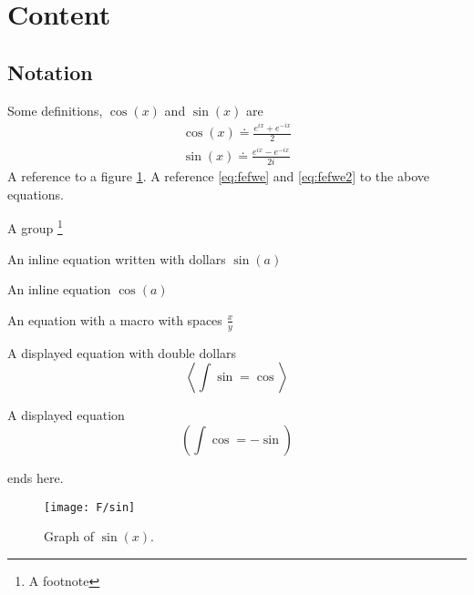 \section{Content}

\subsection{Notation}

\begin{Defn}
  \label{defn:1}
  Some definitions, $\cos(x)$ and \(\sin(x)\) are
  \begin{eqnarray}
    \cos(x) \doteq \frac{e^{ix}+e^{-ix}}{2}  \label{eq:fefwe} \\
    \sin(x) \doteq \frac{e^{ix}-e^{-ix}}{2i} \label{eq:fefwe2}
  \end{eqnarray}
  A reference to a figure \ref{fig:a354}.
  A reference \eqref{eq:fefwe} and  \eqref{eq:fefwe2} to the above equations.
\end{Defn}


A group
\footnote{A footnote}
\bgroup\em

An inline equation written with dollars $\sin(a)$

An inline equation  \(\cos(a)\)

An equation with a macro with spaces
\(\frac x y\)

A displayed equation with double dollars
$$ \left<\int\sin = \cos \right>$$

A displayed equation
\[ \left(\int\cos = -\sin\right)\]

\egroup
ends here.

\begin{figure}[ht]\label{fig:a354}
  \begin{center}
    \texttt{[image: F/sin]}
    \caption{Graph of \(\sin(x)\).}
  \end{center}
\end{figure}


\lipsum[2]


